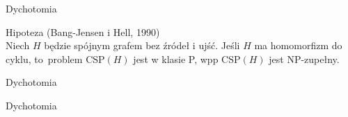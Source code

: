 \begin{frame}{Dychotomia}

    \textcolor{cfblue}{Hipoteza (Bang-Jensen i Hell, 1990)} \\
        Niech \(H\) będzie spójnym grafem bez źródeł i ujść. Jeśli \(H\) ma homomorfizm do cyklu, to~problem CSP\((H)\) jest w klasie P, wpp CSP\((H)\) jest NP-zupełny.

\end{frame}

\begin{frame}{Dychotomia}

\begin{figure}
    \centering
    
\end{figure}

\end{frame}

\begin{frame}{Dychotomia}

\begin{figure}
    \centering
    
\end{figure}

\end{frame}
